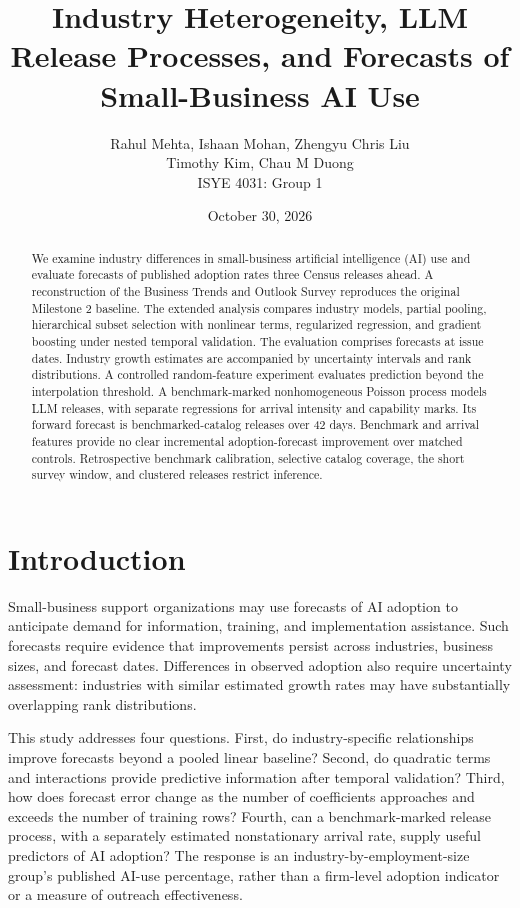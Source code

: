 \documentclass[11pt]{article}
\title{Industry Heterogeneity, LLM Release Processes, and Forecasts of Small-Business AI Use}
\author{\normalsize Rahul Mehta, Ishaan Mohan, Zhengyu Chris Liu\\
\normalsize Timothy Kim, Chau M Duong\\[0.3em]
\normalsize ISYE 4031: Group 1}
\date{October 30, 2026}
\begin{document}
\maketitle
\begin{abstract}
We examine industry differences in small-business artificial intelligence (AI) use and evaluate forecasts of published adoption rates three Census releases ahead. A reconstruction of the Business Trends and Outlook Survey reproduces the original Milestone 2 baseline. The extended analysis compares industry models, partial pooling, hierarchical subset selection with nonlinear terms, regularized regression, and gradient boosting under nested temporal validation. The evaluation comprises \ForecastN{} forecasts at \OriginN{} issue dates. \AbstractResult{}
Industry growth estimates are accompanied by uncertainty intervals and rank distributions. A controlled random-feature experiment evaluates prediction beyond the interpolation threshold. A benchmark-marked nonhomogeneous Poisson process models LLM releases, with separate regressions for arrival intensity and capability marks. Its forward forecast is \ReleaseExpected{} benchmarked-catalog releases over 42 days. Benchmark and arrival features provide no clear incremental adoption-forecast improvement over matched controls. Retrospective benchmark calibration, selective catalog coverage, the short survey window, and clustered releases restrict inference.
\end{abstract}

\section{Introduction}
Small-business support organizations may use forecasts of AI adoption to anticipate demand for information, training, and implementation assistance. Such forecasts require evidence that improvements persist across industries, business sizes, and forecast dates. Differences in observed adoption also require uncertainty assessment: industries with similar estimated growth rates may have substantially overlapping rank distributions.

This study addresses four questions. First, do industry-specific relationships improve forecasts beyond a pooled linear baseline? Second, do quadratic terms and interactions provide predictive information after temporal validation? Third, how does forecast error change as the number of coefficients approaches and exceeds the number of training rows? Fourth, can a benchmark-marked release process, with a separately estimated nonstationary arrival rate, supply useful predictors of AI adoption? The response is an industry-by-employment-size group's published AI-use percentage, rather than a firm-level adoption indicator or a measure of outreach effectiveness.
\end{document}
